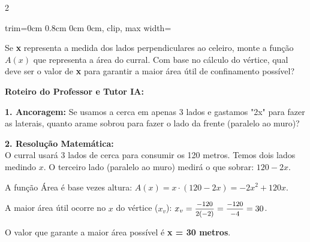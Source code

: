 \begin{multicols*}{2}
\begin{enunciadoLiteral}
\begin{center}
\begin{adjustbox}{trim=0cm 0.8cm 0cm 0cm, clip, max width=\larguraTikz}
\end{adjustbox}
\end{center}

Se \textbf{x} representa a medida dos lados perpendiculares ao celeiro, monte a função $A(x)$ que representa a área do curral. Com base no cálculo do vértice, qual deve ser o valor de \textbf{x} para garantir a maior área útil de confinamento possível?
\end{enunciadoLiteral}

\ifgabarito
    \begin{tcolorbox}[colback=CorTitUm!5, colframe=CorTitUm, boxrule=1pt, arc=4pt, left=6pt, right=6pt, top=6pt, bottom=6pt]
    \small\textbf{\textcolor{CorTitUm}{Roteiro do Professor e Tutor IA:}}\par\vspace{0.1cm}
    \color{CinzaEscuro}
    \textbf{1. Ancoragem:} Se usamos a cerca em apenas 3 lados e gastamos "2x" para fazer as laterais, quanto arame sobrou para fazer o lado da frente (paralelo ao muro)?\par\vspace{0.1cm}
    \textbf{2. Resolução Matemática:}\\
    O curral usará 3 lados de cerca para consumir os 120 metros. 
    Temos dois lados medindo $x$. O terceiro lado (paralelo ao muro) medirá o que sobrar: $120 - 2x$.
    
    A função Área é base vezes altura:
    $A(x) = x \cdot (120 - 2x) = -2x^2 + 120x$.
    
    A maior área útil ocorre no $x$ do vértice ($x_v$):
    $x_v = \mfrac{-120}{2(-2)} = \mfrac{-120}{-4} = 30$.
    
    O valor que garante a maior área possível é \textbf{x = 30 metros}.
    \end{tcolorbox}
    \vspace{0.15cm}
    

\end{multicols*}
